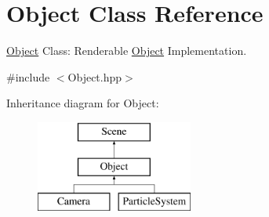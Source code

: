 \hypertarget{class_object}{\section{Object Class Reference}
\label{class_object}
}


\hyperlink{class_object}{Object} Class\-: Renderable \hyperlink{class_object}{Object} Implementation.  




{\ttfamily \#include $<$Object.\-hpp$>$}

Inheritance diagram for Object\-:\begin{figure}[H]
\begin{center}
\leavevmode
\includegraphics[height=3.000000cm]{class_object}
\end{center}
\end{figure}
